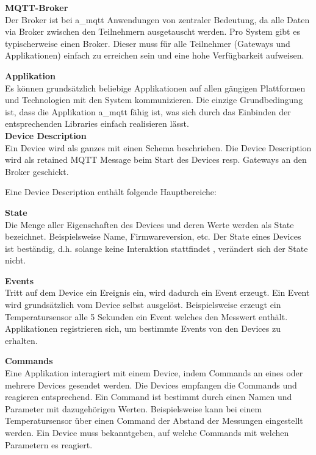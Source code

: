 \newpage
\textbf{MQTT-Broker} \\
Der Broker ist bei \acrshort{a_mqtt} Anwendungen von zentraler Bedeutung, da alle Daten via Broker zwischen den Teilnehmern ausgetauscht werden. Pro System gibt es typischerweise einen Broker. Dieser muss für alle Teilnehmer (Gateways und Applikationen) einfach zu erreichen sein und eine hohe Verfügbarkeit aufweisen.

\textbf{Applikation} \\
Es können grundsätzlich beliebige Applikationen auf allen gängigen Plattformen und Technologien mit den System kommunizieren. Die einzige Grundbedingung ist, dass die Applikation \acrshort{a_mqtt} fähig ist, was sich durch das Einbinden der entsprechenden Libraries einfach realisieren lässt.
\\


\textbf{Device Description} \\
Ein Device wird als ganzes mit einen Schema beschrieben. Die Device Description wird als retained MQTT Message beim Start des Devices resp. Gateways an den Broker geschickt.

Eine Device Description enthält folgende Hauptbereiche:

\textbf{State} \\
Die Menge aller Eigenschaften des Devices und deren Werte werden als State bezeichnet. Beispielsweise Name, Firmwareversion, etc. Der State eines Devices ist beständig, d.h. solange keine Interaktion stattfindet , verändert sich der State nicht.


\textbf{Events} \\
Tritt auf dem Device ein Ereignis ein, wird dadurch ein Event erzeugt. Ein Event wird grundsätzlich vom Device selbst ausgelöst. Beispielsweise erzeugt ein Temperatursensor alle 5 Sekunden ein Event welches den Messwert enthält. Applikationen registrieren sich, um bestimmte Events von den Devices zu erhalten.


\textbf{Commands} \\
Eine Applikation interagiert mit einem Device, indem Commands an eines oder mehrere Devices gesendet werden. Die Devices empfangen die Commands und reagieren entsprechend. Ein Command ist bestimmt durch einen Namen und Parameter mit dazugehörigen Werten. 
Beispielsweise kann bei einem Temperatursensor über einen Command  der Abstand der Messungen eingestellt werden.
Ein Device muss bekanntgeben, auf welche Commands mit welchen Parametern es reagiert.



